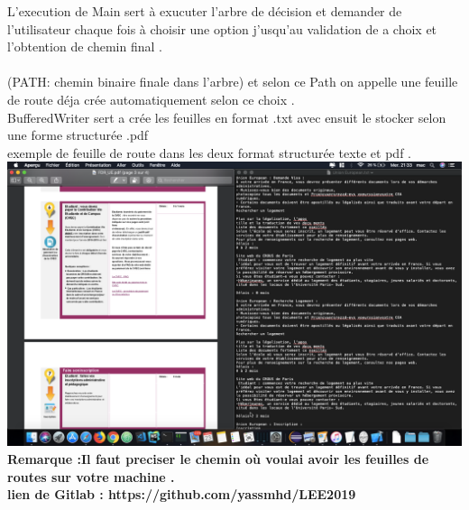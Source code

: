%
 L'execution de Main sert à exucuter l'arbre de décision et demander de l'utilisateur chaque  fois à choisir une option j'usqu'au validation de a choix et l'obtention de chemin final .\\
 \\(PATH: chemin binaire finale dans l'arbre) et selon ce Path on appelle une feuille de route déja crée automatiquement selon ce choix .\\
 
 BufferedWriter sert a crée les feuilles en format .txt avec ensuit le stocker selon une forme structurée .pdf \\
 
 exemple de feuille de route dans les deux format structurée texte et pdf .
 \includegraphics[scale=0.3]{Images/resultat.png}\\
 
 
\textbf{ Remarque :Il faut preciser le chemin où voulai avoir les feuilles de routes sur votre machine .}\\


\textbf{ lien de Gitlab : https://github.com/yassmhd/LEE2019 }
